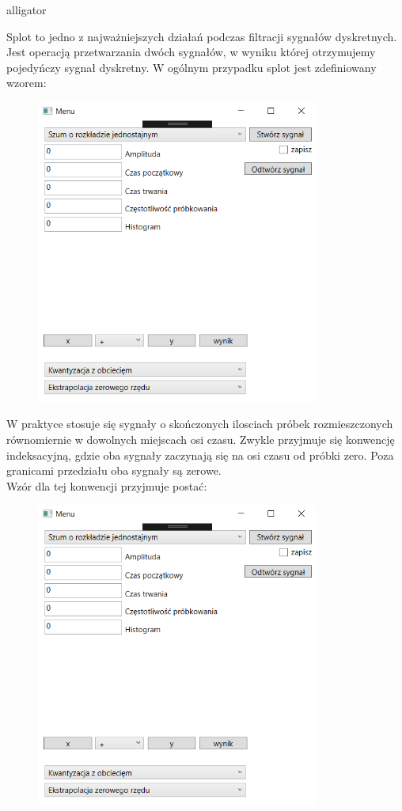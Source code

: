 \documentclass[12pt]{article}
\begin{document}
\begin{labeling}{alligator}


\item [Splot] to jedno z najważniejszych działań podczas filtracji sygnałów dyskretnych. Jest operacją przetwarzania dwóch sygnałów, w wyniku której otrzymujemy pojedyńczy sygnał dyskretny.  W ogólnym przypadku splot jest zdefiniowany wzorem:
\begin{figure}[h!]
 \centering
 \includegraphics[width=9.3cm]{ui1.PNG}
 \vspace{-0.3cm}
 \label{Widok_aplikacjis}
\end{figure}
W praktyce stosuje się sygnały o skończonych ilosciach próbek rozmieszczonych równomiernie w dowolnych miejscach osi czasu. Zwykle przyjmuje się konwencję indeksacyjną, gdzie oba sygnały zaczynają się  na osi czasu od próbki zero. Poza granicami przedziału oba sygnały są zerowe. 
\\Wzór dla tej konwencji przyjmuje postać: 
\begin{figure}[h!]
 \centering
 \includegraphics[width=9.3cm]{ui1.PNG}
 \vspace{-0.3cm}
 \label{Splot_indeks}
\end{figure}


\end{labeling}
\end{document}
